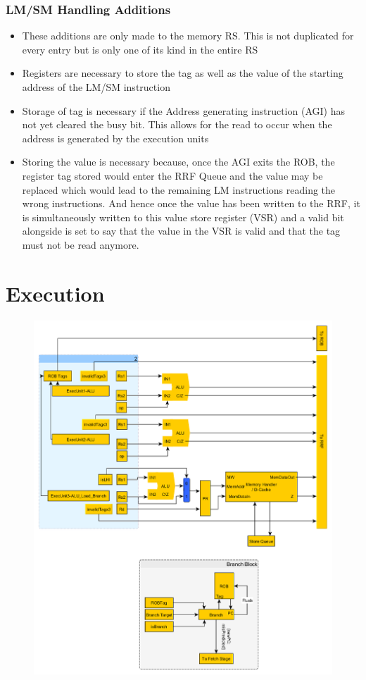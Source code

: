\documentclass{article}
\begin{document}
\subsubsection{LM/SM Handling Additions}
\begin{itemize}
\item These additions are only made to the memory RS. This is not duplicated for every entry but is only one of its kind in the entire RS
\item Registers are necessary to store the tag as well as the value of the starting address of the LM/SM instruction
\item Storage of tag is necessary if the Address generating instruction (AGI) has not yet cleared the busy bit. This allows for the read to occur when the address is generated by the execution units
\item Storing the value is necessary because, once the AGI exits the ROB, the register tag stored would enter the RRF Queue and the value may be replaced which would lead to the remaining LM instructions reading the wrong instructions. And hence once the value has been written to the RRF, it is simultaneously written to this value store register (VSR) and a valid bit alongside is set to say that the value in the VSR is valid and that the tag must not be read anymore.
\end{itemize}

\section{Execution}
\begin{figure}[H]
	\centering
	\includegraphics[scale = 0.5]{../GraphImages/execution_stage.png}
\end{figure}
\end{document}
